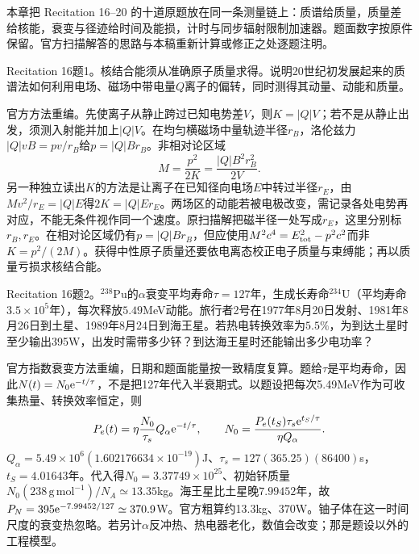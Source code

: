 本章把 Recitation 16--20 的十道原题放在同一条测量链上：质谱给质量，质量差给核能，衰变与径迹给时间及能损，计时与同步辐射限制加速器。题面数字按原件保留。官方扫描解答的思路与本稿重新计算或修正之处逐题注明。
\begin{exercise}\label{ex:rec-16-1}
Recitation 16题1。核结合能须从准确原子质量求得。说明20世纪初发展起来的质谱法如何利用电场、磁场中带电量$Q$离子的偏转，同时测得其动量、动能和质量。
\end{exercise}
\begin{solution}
官方方法重编。先使离子从静止跨过已知电势差$V$，则$K=|Q|V$；若不是从静止出发，须测入射能并加上$|Q|V$。在均匀横磁场中量轨迹半径$r_B$，洛伦兹力$|Q|vB=pv/r_B$给$p=|Q|Br_B$。非相对论区域
\begin{equation}M=\frac{p^2}{2K}=\frac{|Q|B^2r_B^2}{2V}.
\end{equation}
另一种独立读出$K$的方法是让离子在已知径向电场$E$中转过半径$r_E$，由$Mv^2/r_E=|Q|E$得$2K=|Q|Er_E$。两场区的动能若被电极改变，需记录各处电势再对应，不能无条件视作同一个速度。原扫描解把磁半径一处写成$r_E$，这里分别标$r_B,r_E$。在相对论区域仍有$p=|Q|Br_B$，但应使用$M^2c^4=E_{\rm tot}^2-p^2c^2$而非$K=p^2/(2M)$。获得中性原子质量还要依电离态校正电子质量与束缚能；再以质量亏损求核结合能。
\end{solution}
\begin{exercise}\label{ex:rec-16-2}
Recitation 16题2。$^{238}$Pu的$\alpha$衰变平均寿命$\tau=127$年，生成长寿命$^{234}$U（平均寿命$3.5\times10^5$年），每次释放$5.49$MeV动能。旅行者2号在1977年8月20日发射、1981年8月26日到土星、1989年8月24日到海王星。若热电转换效率为$5.5\%$，为到达土星时至少输出395W，出发时需带多少钚？到达海王星时还能输出多少电功率？
\end{exercise}
\begin{solution}
官方指数衰变方法重编，日期和题面能量按一致精度复算。题给$\tau$是平均寿命，因此$N(t)=N_0\mathrm e^{-t/\tau}$，不是把127年代入半衰期式。以题设把每次5.49MeV作为可收集热量、转换效率恒定，则
\begin{equation}P_e(t)=\eta\frac{N_0}{\tau_s}Q_\alpha\mathrm e^{-t/\tau},\qquad
N_0=\frac{P_e(t_S)\tau_s\mathrm e^{t_S/\tau}}{\eta Q_\alpha}.
\end{equation}
$Q_\alpha=5.49\times10^6(1.602176634\times10^{-19})$J、$\tau_s=127(365.25)(86400)$s，$t_S=4.01643$年。代入得$N_0=3.37749\times10^{25}$、初始钚质量$N_0(238\,\mathrm{g\,mol^{-1}})/N_A\simeq13.35$kg。海王星比土星晚$7.99452$年，故$P_N=395\mathrm e^{-7.99452/127}\simeq370.9$W。官方粗算约13.3kg、370W。铀子体在这一时间尺度的衰变热忽略。若另计$\alpha$反冲热、热电器老化，数值会改变；那是题设以外的工程模型。
\end{solution}
